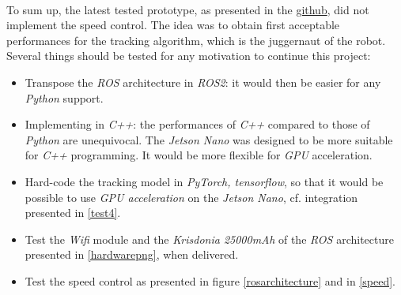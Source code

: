 \\\indent To sum up, the latest tested prototype, as presented in the \href{https://github.com/klipfel/tracker-v1}{github},
did not implement the speed control. The idea was to obtain first acceptable performances
for the tracking algorithm, which is the juggernaut of the robot. Several 
things should be tested for any motivation to continue this project:
\begin{itemize}
	\item[\textbullet] Transpose the \textit{ROS} architecture in \textit{ROS2}: it would then 
	be easier for any \textit{Python} support.
	\item[\textbullet] Implementing in \textit{C++}: the performances of
	\textit{C++} compared to those of \textit{Python} are unequivocal. The \textit{Jetson Nano}
	was designed to be more suitable for \textit{C++} programming. It would be more
	flexible for \textit{GPU} acceleration.
	\item[\textbullet] Hard-code the tracking model in \textit{PyTorch, tensorflow}, so that 
	it would be possible to use \textit{GPU acceleration} on the \textit{Jetson Nano}, cf. 
	integration presented in \vref{test4}.
	\item[\textbullet] Test the \textit{Wifi} module and the \textit{Krisdonia 25000mAh}
	of the \textit{ROS} architecture 
	presented in \vref{hardwarepng}, when delivered.
	\item[\textbullet] Test the speed control as presented in figure \vref{rosarchitecture} and in \vref{speed}.
\end{itemize}